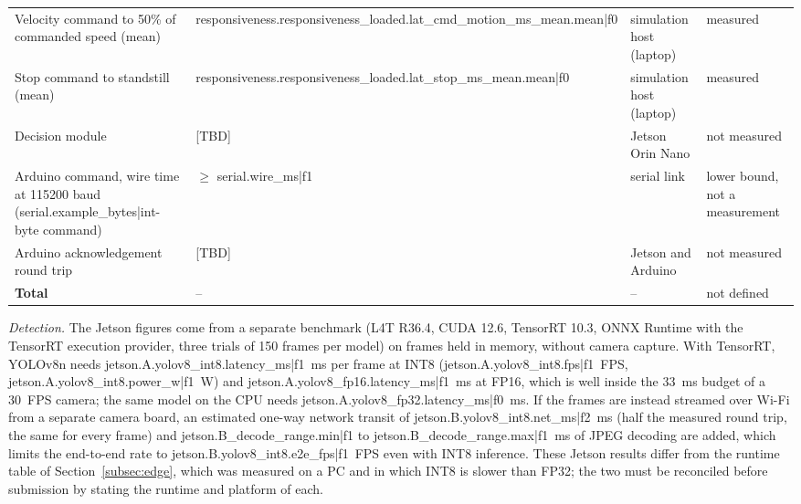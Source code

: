 \begin{table}[htbp]
{\begin{tabular}{llll}
Velocity command to 50\% of commanded speed (mean) & {{responsiveness.responsiveness_loaded.lat_cmd_motion_ms_mean.mean|f0}} & simulation host (laptop) & measured \\
Stop command to standstill (mean) & {{responsiveness.responsiveness_loaded.lat_stop_ms_mean.mean|f0}} & simulation host (laptop) & measured \\
Decision module & [TBD] & Jetson Orin Nano & not measured \\
Arduino command, wire time at 115200 baud ({{serial.example_bytes|int}}-byte command) & $\geq$ {{serial.wire_ms|f1}} & serial link & lower bound, not a measurement \\
Arduino acknowledgement round trip & [TBD] & Jetson and Arduino & not measured \\
\midrule
\textbf{Total} & -- & -- & not defined \\
\bottomrule
\end{tabular}}
\end{table}

\noindent\textit{Detection.} The Jetson figures come from a separate benchmark (L4T R36.4, CUDA 12.6, TensorRT 10.3, ONNX Runtime with the TensorRT execution provider, three trials of 150 frames per model) on frames held in memory, without camera capture. With TensorRT, YOLOv8n needs {{jetson.A.yolov8_int8.latency_ms|f1}}~ms per frame at INT8 ({{jetson.A.yolov8_int8.fps|f1}}~FPS, {{jetson.A.yolov8_int8.power_w|f1}}~W) and {{jetson.A.yolov8_fp16.latency_ms|f1}}~ms at FP16, which is well inside the 33~ms budget of a 30~FPS camera; the same model on the CPU needs {{jetson.A.yolov8_fp32.latency_ms|f0}}~ms. If the frames are instead streamed over Wi-Fi from a separate camera board, an estimated one-way network transit of {{jetson.B.yolov8_int8.net_ms|f2}}~ms (half the measured round trip, the same for every frame) and {{jetson.B_decode_range.min|f1}} to {{jetson.B_decode_range.max|f1}}~ms of JPEG decoding are added, which limits the end-to-end rate to {{jetson.B.yolov8_int8.e2e_fps|f1}}~FPS even with INT8 inference. These Jetson results differ from the runtime table of Section~\ref{subsec:edge}, which was measured on a PC and in which INT8 is slower than FP32; the two must be reconciled before submission by stating the runtime and platform of each.

